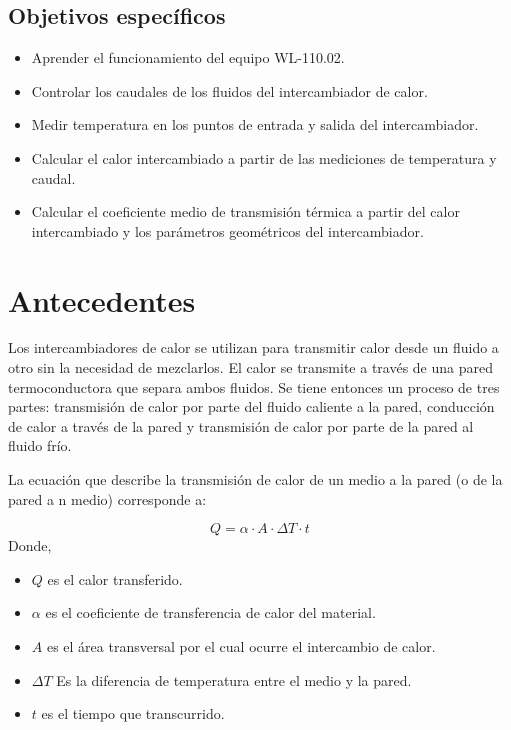 \documentclass[letterpaper,11pt]{article} %
\begin{document}
\subsection{Objetivos específicos}
\begin{itemize}
    \item Aprender el funcionamiento del equipo WL-110.02.
    \item Controlar los caudales de los fluidos del intercambiador de calor.
    \item Medir temperatura en los puntos de entrada y salida del intercambiador.
    \item Calcular el calor intercambiado a partir de las mediciones de temperatura y caudal.
    \item Calcular el coeficiente medio de transmisión térmica a partir del calor intercambiado y los parámetros geométricos del intercambiador.
\end{itemize}
		
\newpage
\section{Antecedentes}
Los intercambiadores de calor se utilizan para transmitir calor desde un fluido a otro sin la necesidad de mezclarlos. El calor se transmite a través de una pared termoconductora que separa ambos fluidos.
Se tiene entonces un proceso de tres partes: transmisión de calor por parte del fluido caliente a la pared, conducción de calor a través de la pared y transmisión de calor por parte de la pared al fluido frío.

La ecuación que describe la transmisión de calor de un medio a la pared (o de la pared a n medio) corresponde a:

\begin{equation}
    Q = \alpha \cdot A \cdot \Delta T \cdot t
\end{equation}
 Donde, 
 \begin{itemize}
     \item $Q$ es el calor transferido.
     \item $\alpha$ es el coeficiente de transferencia de calor del material.
     \item $A$ es el área transversal por el cual ocurre el intercambio de calor.
     \item $\Delta T$ Es la diferencia de temperatura entre el medio y la pared.
     \item $t$ es el tiempo que transcurrido.
 \end{itemize} 
 
\end{document}
